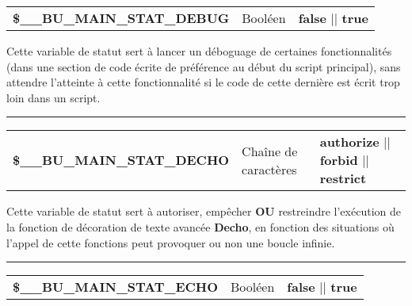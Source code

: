 \documentclass[a4paper,10pt]{article}
\begin{document}
    \begin{justify}
        \begin{tabular}{l|l|l}
            \textbf{\color{vars}\$\_\_BU\_MAIN\_STAT\_DEBUG}  & Booléen & \textbf{false} || \textbf{true} \\[1\baselineskip]
        \end{tabular}
    \end{justify}

    \begin{justify}
        Cette variable de statut sert à lancer un déboguage de certaines fonctionnalités (dans une section de code écrite de préférence au début du script principal), sans attendre l'atteinte à cette fonctionnalité si le code de cette dernière est écrit trop loin dans un script.
    \end{justify}


    \par\noindent\rule{\textwidth}{0.4pt}

    \begin{justify}
        \begin{tabular}{l|l|l}
            \textbf{\color{vars}\$\_\_BU\_MAIN\_STAT\_DECHO}  & Chaîne de caractères    & \textbf{authorize} || \textbf{forbid} || \textbf{restrict}\\[1\baselineskip]
        \end{tabular}
    \end{justify}

    \begin{justify}
        Cette variable de statut sert à autoriser, empêcher \textbf{OU} restreindre l'exécution de la fonction de décoration de texte avancée \textbf{\color{func}Decho}, en fonction des situations où l'appel de cette fonctions peut provoquer ou non une boucle infinie.
    \end{justify}


    \par\noindent\rule{\textwidth}{0.4pt}

    \begin{justify}
        \begin{tabular}{l|l|l}
            \textbf{\color{vars}\$\_\_BU\_MAIN\_STAT\_ECHO}   & Booléen      & \textbf{false} || \textbf{true}\\[1\baselineskip]
        \end{tabular}
    \end{justify}
\end{document}

